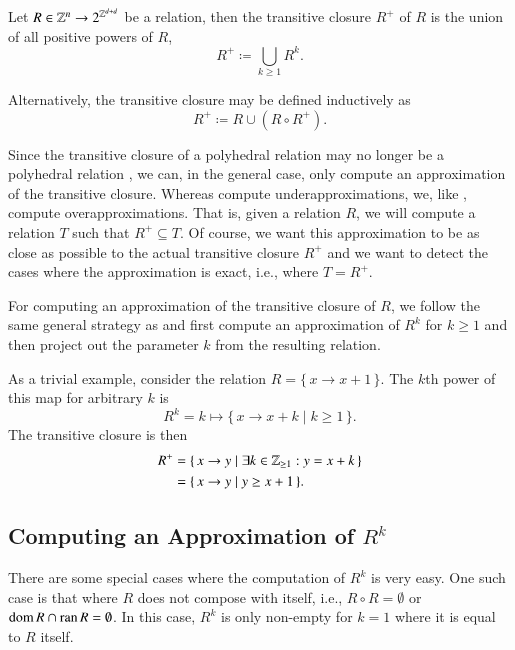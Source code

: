 \begin{definition}
Let $R \in \mathbb{Z}^n \to 2^{\mathbb{Z}^{d+d}}$ be a relation,
then the transitive closure $R^+$ of $R$ is the union
of all positive powers of $R$,
$$
R^+ \coloneqq \bigcup_{k \ge 1} R^k
.
$$
\end{definition}
Alternatively, the transitive closure may be defined
inductively as
\begin{equation}
\label{eq:transitive:inductive}
R^+ \coloneqq R \cup \left(R \circ R^+\right)
.
\end{equation}

Since the transitive closure of a polyhedral relation
may no longer be a polyhedral relation ,
we can, in the general case, only compute an approximation
of the transitive closure.
Whereas  compute underapproximations,
we, like , compute overapproximations.
That is, given a relation $R$, we will compute a relation $T$
such that $R^+ \subseteq T$.  Of course, we want this approximation
to be as close as possible to the actual transitive closure
$R^+$ and we want to detect the cases where the approximation is
exact, i.e., where $T = R^+$.

For computing an approximation of the transitive closure of $R$,
we follow the same general strategy as 
and first compute an approximation of $R^k$ for $k \ge 1$ and then project
out the parameter $k$ from the resulting relation.

\begin{example}
As a trivial example, consider the relation
$R = \{\, x \to x + 1 \,\}$.  The $k$th power of this map
for arbitrary $k$ is
$$
R^k = k \mapsto \{\, x \to x + k \mid k \ge 1 \,\}
.
$$
The transitive closure is then
$$
\begin{aligned}
R^+ & = \{\, x \to y \mid \exists k \in \mathbb{Z}_{\ge 1} : y = x + k \,\}
\\
& = \{\, x \to y \mid y \ge x + 1 \,\}
.
\end{aligned}
$$
\end{example}

\subsection{Computing an Approximation of $R^k$}
\label{s:power}

There are some special cases where the computation of $R^k$ is very easy.
One such case is that where $R$ does not compose with itself,
i.e., $R \circ R = \emptyset$ or $\mathop{\rm dom}\nolimits R \cap \mathop{\rm ran}\nolimits R = \emptyset$.
In this case, $R^k$ is only non-empty for $k=1$ where it is equal
to $R$ itself.

